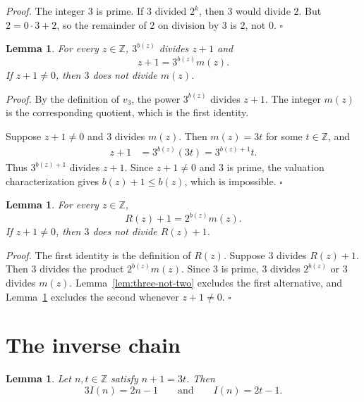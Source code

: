 \documentclass[11pt,letterpaper]{article}
\newcommand{\Z}{\mathbb{Z}}
\newtheorem{lemma}[theorem]{Lemma}
\newenvironment{proof}{\noindent\textit{Proof.}}{\hfill\(\square\)}
\begin{document}
\begin{proof}
The integer \(3\) is prime. If \(3\) divided \(2^k\), then \(3\) would divide \(2\). But \(2=0\cdot 3+2\), so the remainder of \(2\) on division by \(3\) is \(2\), not \(0\).
\end{proof}

\begin{lemma}
\label{lem:cofactor}
For every \(z\in\Z\), \(3^{b(z)}\) divides \(z+1\) and
\[
z+1=3^{b(z)}m(z).
\]
If \(z+1\neq 0\), then \(3\) does not divide \(m(z)\).
\end{lemma}

\begin{proof}
By the definition of \(v_3\), the power \(3^{b(z)}\) divides \(z+1\). The integer \(m(z)\) is the corresponding quotient, which is the first identity.

Suppose \(z+1\neq 0\) and \(3\) divides \(m(z)\). Then \(m(z)=3t\) for some \(t\in\Z\), and
\begin{align*}
z+1
&=3^{b(z)}(3t)
=3^{b(z)+1}t.
\end{align*}
Thus \(3^{b(z)+1}\) divides \(z+1\). Since \(z+1\neq 0\) and \(3\) is prime, the valuation characterization gives \(b(z)+1\leq b(z)\), which is impossible.
\end{proof}

\begin{lemma}
\label{lem:root-translate}
For every \(z\in\Z\),
\[
R(z)+1=2^{b(z)}m(z).
\]
If \(z+1\neq 0\), then \(3\) does not divide \(R(z)+1\).
\end{lemma}

\begin{proof}
The first identity is the definition of \(R(z)\). Suppose \(3\) divides \(R(z)+1\). Then \(3\) divides the product \(2^{b(z)}m(z)\). Since \(3\) is prime, \(3\) divides \(2^{b(z)}\) or \(3\) divides \(m(z)\). Lemma~\ref{lem:three-not-two} excludes the first alternative, and Lemma~\ref{lem:cofactor} excludes the second whenever \(z+1\neq 0\).
\end{proof}

\section{The inverse chain}

\begin{lemma}
\label{lem:inverse-step}
Let \(n,t\in\Z\) satisfy \(n+1=3t\). Then
\[
3I(n)=2n-1
\qquad\text{and}\qquad
I(n)=2t-1.
\]
\end{lemma}
\end{document}
